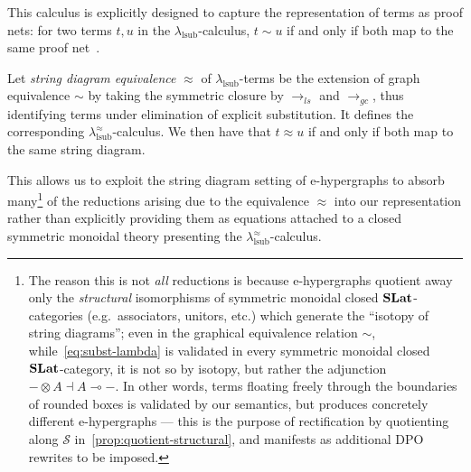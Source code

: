 This calculus is explicitly designed to capture the representation of terms as proof nets: for two terms $t, u$ in the $\lambda_{\text{lsub}}$-calculus, $t \sim u$ if and only if both map to the same proof net~\cite{accattoliJumpingBoxGraphical2011}.
\begin{proposition}{\cite[§ 5.1.1]{ghica2024stringdiagramslambdacalculifunctional}}
	Let \emph{string diagram equivalence} $\approx$ of $\lambda_{\text{lsub}}$-terms be the extension of graph equivalence $\sim$ by taking the symmetric closure by $\to_{ls}$ and $\to_{gc}$, thus identifying terms under elimination of explicit substitution.
	It defines the corresponding $\lambda^\approx_{\text{lsub}}$-calculus.
	We then have that $t \approx u$ if and only if both map to the same string diagram.
\end{proposition}
This allows us to exploit the string diagram setting of e-hypergraphs to absorb many\footnote{The reason this is not \emph{all} reductions is because e-hypergraphs quotient away only the \emph{structural} isomorphisms of symmetric monoidal closed $\mathbf{SLat}$-categories (e.g.\ associators, unitors, etc.) which generate the \enquote{isotopy of string diagrams}; even in the graphical equivalence relation $\sim$, while~\autoref{eq:subst-lambda} is validated in every symmetric monoidal closed $\mathbf{SLat}$-category, it is not so by isotopy, but rather the adjunction $ - \otimes A \dashv A \multimap -$. In other words, terms floating freely through the boundaries of rounded boxes is validated by our semantics, but produces concretely different e-hypergraphs --- this is the purpose of rectification by quotienting along $\mathcal{S}$ in~\autoref{prop:quotient-structural}, and manifests as additional DPO rewrites to be imposed.} of the reductions arising due to the equivalence $\approx$ into our representation rather than explicitly providing them as equations attached to a closed symmetric monoidal theory presenting the $\lambda^\approx_{\text{lsub}}$-calculus.

